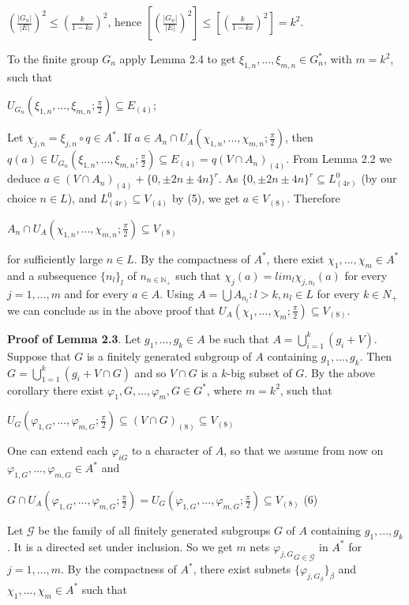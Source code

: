 \documentclass[12pt]{article}
\begin{document}
        $(\frac{|G_n|}{|E|})^2 \leqslant (\frac{k}{1-k \varepsilon})^2$, hence $[(\frac{|G_n|}{|E|})^2]\leqslant[(\frac{k}{1-k \varepsilon})^2]=k^2$.
    

    To the finite group $G_n$ apply Lemma 2.4 to get $\xi_{1,n},...,\xi_{m,n} \in G^*_n$, with $m = k^2$, such that


        $U_{G_n}(\xi_{1,n}, . . . , \xi_{m,n}; \frac{\pi}{2}) \subseteq E_{(4)}$;


    Let $\chi_{j,n} = \xi_{j,n} \circ q \in A^*$. If $a \in A_n \cap U_A(\chi_{1,n},...,\chi_{m,n}; \frac{\pi}{2} )$, then $q(a) \in U_{G_n} (\xi_{1,n},...,\xi_{m,n}; \frac{\pi}{2} ) \subseteq E_{(4)} = q(V \cap A_n)_{(4)}$. From
    Lemma 2.2 we deduce $a \in (V \cap A_n)_{(4)} + \{0,\pm 2n \pm 4n\}^r$. As $\{0,\pm 2n \pm 4n\}^r \subseteq L^0_{(4r)}$ (by our choice $n \in L$), and $L^0_{(4r)} \subseteq V_{(4)}$
    by (5), we get $a \in V_{(8)}$. Therefore


        $A_n \cap U_A (\chi_{1,n},\ldots ,\chi_{m,n}; \frac{\pi}{2}) \subseteq V_{(8)}$

    
    for sufficiently large $n \in L$. By the compactness of $A^*$, there exist $\chi_1,...,\chi_m \in A^*$ and a subsequence $\{n_l\}_l$ of ${n}_{n \in \mathbb{N}_+}$ such
    that $\chi_j (a) = lim_l \chi_{j,n_l}(a)$ for every $j = 1,...,m$ and for every $a \in A$. Using $A = \bigcup{A_{n_l}: l > k, n_l ∈ L}$ for every $k \in {N}_+$ we
    can conclude as in the above proof that $U_A (\chi_1,...,\chi_m; \frac{\pi}{2}) \subseteq V_{(8)}$.


    \textbf{Proof of Lemma 2.3}. Let $g_1,..., g_k \in A$ be such that $A = \bigcup^k_{i=1} (g_i + V )$. Suppose that $G$ is a finitely generated subgroup
    of $A$ containing $g_1,..., g_k$. Then $G = \bigcup^k_{1=1}(g_i + V \cap G)$ and so $V \cap G$ is a $k$-big subset of $G$. By the above corollary there
    exist $\varphi_1,G,...,\varphi_m,G \in G^*$, where $m = k^2$, such that


        $U_G(\varphi_{1,G}, ... , \varphi_{m,G}; \frac{\pi}{2}) \subseteq (V \cap G)_{(8)} \subseteq V_{(8)}$


    One can extend each $\varphi_{iG}$ to a character of $A$, so that we assume from now on $\varphi_{1,G},...,\varphi_{m,G} \in A^*$ and


        $G \cap U_A (\varphi_{1,G}, ... , \varphi_{m,G}; \frac{\pi}{2}) = U_G(\varphi_{1,G}, ... , \varphi_{m,G}; \frac{\pi}{2}) \subseteq V_{(8)}$ (6)


        Let $\mathcal{G}$ be the family of all finitely generated subgroups $G$ of $A$ containing $g_1,..., g_k$. It is a directed set under inclusion. So
    we get $m$ nets ${\varphi_{j,G}}_{G \in \mathcal{G}}$ in $A^*$ for $j = 1,...,m$. By the compactness of $A^*$, there exist subnets $\{\varphi_{j,G_\beta}\}_\beta$ and $\chi_1,...,\chi_m \in A^*$
    such that
\end{document}
